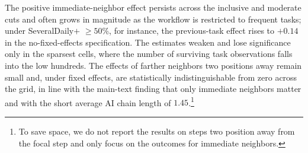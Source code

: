 The positive immediate-neighbor effect persists across the inclusive and moderate cuts and often grows in magnitude as the workflow is restricted to frequent tasks; under SeveralDaily$+$ $\geq 50\%$, for instance, the previous-task effect rises to $+0.14$ in the no-fixed-effects specification.
The estimates weaken and lose significance only in the sparsest cells, where the number of surviving task observations falls into the low hundreds.
The effects of farther neighbors two positions away remain small and, under fixed effects, are statistically indistinguishable from zero across the grid, in line with the main-text finding that only immediate neighbors matter and with the short average AI chain length of $1.45$.\footnote{ To save space, we do not report the results on steps two position away from the focal step and only focus on the outcomes for immediate neighbors.}

